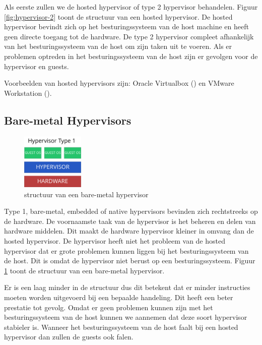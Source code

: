 \documentclass[pdftex,a4paper,12pt,twoside]{report}
\begin{document}
Als eerste zullen we de hosted hypervisor of type 2 hypervisor behandelen. Figuur \ref{fig:hypervisor-2} toont de structuur van een hosted hypervisor. De hosted hypervisor bevindt zich op het besturingssysteem van de host machine en heeft geen directe toegang tot de hardware. De type 2 hypervisor compleet afhankelijk van het besturingssysteem van de host om zijn taken uit te voeren. Als er problemen optreden in het besturingssysteem van de host zijn er gevolgen voor de hypervisor en guests.

Voorbeelden van hosted hypervisors zijn: Oracle Virtualbox (\cite{oracle_oracle_2016}) en VMware Workstation (\cite{vmware_vmware_2016-1}).

\subsection{Bare-metal Hypervisors}

\begin{figure}
    \centering
    \includegraphics[width=3cm]{img/hypervisor-1}
    \caption{structuur van een bare-metal hypervisor}
    \label{fig:hypervisor-1}
\end{figure}

Type 1, bare-metal, embedded of native hypervisors bevinden zich rechtstreeks op de hardware. De voornaamste taak van de hypervisor is het beheren en delen van hardware middelen. Dit maakt de hardware hypervisor kleiner in omvang dan de hosted hypervisor. De hypervisor heeft niet het probleem van de hosted hypervisor dat er grote problemen kunnen liggen bij het besturingssysteem van de host. Dit is omdat de hypervisor niet berust op een besturingssysteem. Figuur \ref{fig:hypervisor-1} toont de structuur van een bare-metal hypervisor.

Er is een laag minder in de structuur dus dit betekent dat er minder instructies moeten worden uitgevoerd  bij een bepaalde handeling. Dit heeft een beter prestatie tot gevolg. Omdat er geen problemen kunnen zijn met het besturingssysteem van de host kunnen we aannemen dat deze soort hypervisor stabieler is. Wanneer het besturingssysteem van de host faalt bij een hosted hypervisor dan zullen de guests ook falen.
\end{document}
